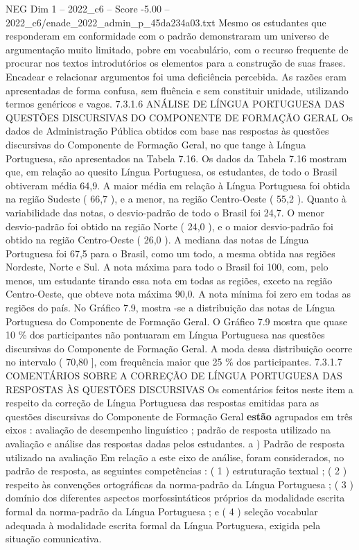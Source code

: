 \begin{textsample}{NEG Dim 1 – 2022\_c6 – Score -5.00 – 2022\_c6/enade\_2022\_admin\_p\_45da234a03.txt}
Mesmo os estudantes que responderam em conformidade com o padrão demonstraram um universo de argumentação muito limitado, pobre em vocabulário, com o recurso frequente de procurar nos textos introdutórios os elementos para a construção de suas frases.
Encadear e relacionar argumentos foi uma deficiência percebida.
As razões eram apresentadas de forma confusa, sem fluência e sem constituir unidade, utilizando termos genéricos e vagos. 7.3.1.6 ANÁLISE DE LÍNGUA PORTUGUESA DAS QUESTÕES DISCURSIVAS DO COMPONENTE DE FORMAÇÃO GERAL Os dados de Administração Pública obtidos com base nas respostas às questões discursivas do Componente de Formação Geral, no que tange à Língua Portuguesa, são apresentados na Tabela 7.16.
Os dados da Tabela 7.16 mostram que, em relação ao quesito Língua Portuguesa, os estudantes, de todo o Brasil obtiveram média 64,9.
A maior média em relação à Língua Portuguesa foi obtida na região Sudeste ( 66,7 ), e a menor, na região Centro-Oeste ( 55,2 ).
Quanto à variabilidade das notas, o desvio-padrão de todo o Brasil foi 24,7.
O menor desvio-padrão foi obtido na região Norte ( 24,0 ), e o maior desvio-padrão foi obtido na região Centro-Oeste ( 26,0 ).
A mediana das notas de Língua Portuguesa foi 67,5 para o Brasil, como um todo, a mesma obtida nas regiões Nordeste, Norte e Sul.
A nota máxima para todo o Brasil foi 100, com, pelo menos, um estudante tirando essa nota em todas as regiões, exceto na região Centro-Oeste, que obteve nota máxima 90,0.
A nota mínima foi zero em todas as regiões do país.
No Gráfico 7.9, mostra -se a distribuição das notas de Língua Portuguesa do Componente de Formação Geral.
O Gráfico 7.9 mostra que quase 10 \% dos participantes não pontuaram em Língua Portuguesa nas questões discursivas do Componente de Formação Geral.
A moda dessa distribuição ocorre no intervalo ( 70,80 ], com frequência maior que 25 \% dos participantes. 7.3.1.7 COMENTÁRIOS SOBRE A CORREÇÃO DE LÍNGUA PORTUGUESA DAS RESPOSTAS ÀS QUESTÕES DISCURSIVAS Os comentários feitos neste item a respeito da correção de Língua Portuguesa das respostas emitidas para as questões discursivas do Componente de Formação Geral \textbf{estão} agrupados em três eixos : avaliação de desempenho linguístico ; padrão de resposta utilizado na avaliação e análise das respostas dadas pelos estudantes. a ) Padrão de resposta utilizado na avaliação Em relação a este eixo de análise, foram considerados, no padrão de resposta, as seguintes competências : ( 1 ) estruturação textual ; ( 2 ) respeito às convenções ortográficas da norma-padrão da Língua Portuguesa ; ( 3 ) domínio dos diferentes aspectos morfossintáticos próprios da modalidade escrita formal da norma-padrão da Língua Portuguesa ; e ( 4 ) seleção vocabular adequada à modalidade escrita formal da Língua Portuguesa, exigida pela situação comunicativa.

\end{textsample}
